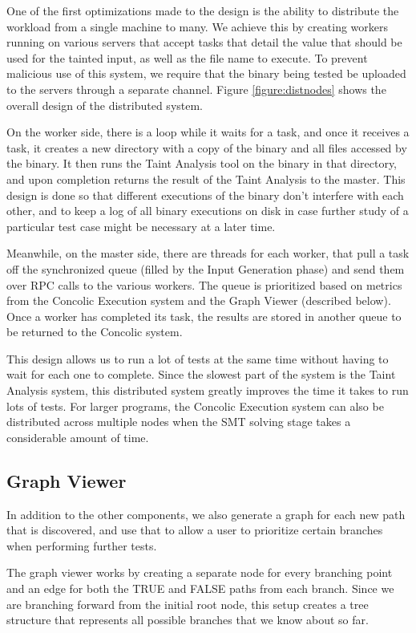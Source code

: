 One of the first optimizations made to the design is the ability to distribute
the workload from a single machine to many. We achieve this by creating workers
running on various servers that accept tasks that detail the value that should
be used for the tainted input, as well as the file name to execute. To prevent
malicious use of this system, we require that the binary being tested be
uploaded to the servers through a separate channel. Figure
\ref{figure:distnodes} shows the overall design of the distributed system.

On the worker side, there is a loop while it waits for a task, and once it
receives a task, it creates a new directory with a copy of the binary and all
files accessed by the binary. It then runs the Taint Analysis tool on the binary
in that directory, and upon completion returns the result of the Taint Analysis
to the master. This design is done so that different executions of the binary
don't interfere with each other, and to keep a log of all binary executions on
disk in case further study of a particular test case might be necessary at a
later time.

Meanwhile, on the master side, there are threads for each worker, that pull a
task off the synchronized queue (filled by the Input Generation phase) and send
them over RPC calls to the various workers. The queue is prioritized based on
metrics from the Concolic Execution system and the Graph Viewer (described
below). Once a worker has completed its task, the results are stored in another
queue to be returned to the Concolic system.

This design allows us to run a lot of tests at the same time without having to
wait for each one to complete. Since the slowest part of the system is the Taint
Analysis system, this distributed system greatly improves the time it takes to
run lots of tests. For larger programs, the Concolic Execution system can also
be distributed across multiple nodes when the SMT solving stage takes a
considerable amount of time.

\subsection{Graph Viewer}
In addition to the other components, we also generate a graph for each new path
that is discovered, and use that to allow a user to prioritize certain branches
when performing further tests.

The graph viewer works by creating a separate node for every branching point and
an edge for both the TRUE and FALSE paths from each branch. Since we are
branching forward from the initial root node, this setup creates a tree
structure that represents all possible branches that we know about so far.

